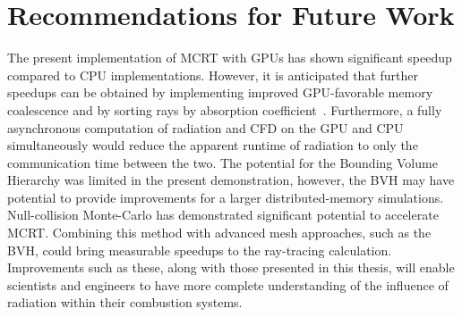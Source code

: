 \section{Recommendations for Future Work}
The present implementation of MCRT with GPUs has shown significant speedup compared to CPU implementations. However, it is anticipated that further speedups can be obtained by implementing improved GPU-favorable memory coalescence and by sorting rays by absorption coefficient~\cite{Silvestri2019ASimulation}.
Furthermore, a fully asynchronous computation of radiation and CFD on the GPU and CPU simultaneously would reduce the apparent runtime of radiation to only the communication time between the two. The potential for the Bounding Volume Hierarchy was limited in the present demonstration, however, the BVH may have potential to provide improvements for a larger distributed-memory simulations.
Null-collision Monte-Carlo has demonstrated significant potential to accelerate MCRT. Combining this method with advanced mesh approaches, such as the BVH, could bring measurable speedups to the ray-tracing calculation.
Improvements such as these, along with those presented in this thesis, will enable scientists and engineers to have more complete understanding of the influence of radiation within their combustion systems. 